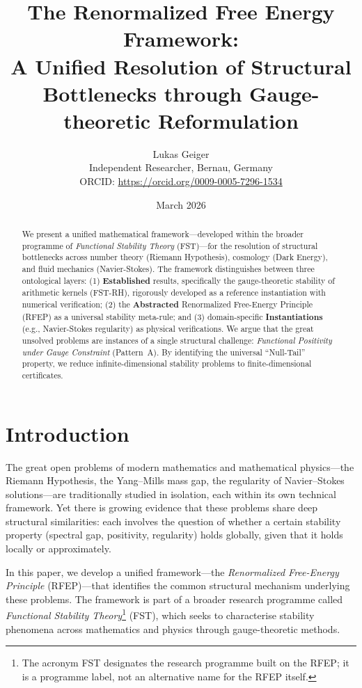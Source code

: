 \documentclass[12pt,a4paper]{article}
\title{%
  The Renormalized Free Energy Framework:\\
  A Unified Resolution of Structural Bottlenecks through Gauge-theoretic Reformulation
}
\author{%
  Lukas Geiger\\
  \small Independent Researcher, Bernau, Germany\\
  \small ORCID: \url{https://orcid.org/0009-0005-7296-1534}
}
\date{March 2026}
\theoremstyle{definition}
\theoremstyle{remark}
\begin{document}
\maketitle

\begin{abstract}
We present a unified mathematical framework---developed within the broader programme of \emph{Functional Stability Theory} (FST)---for the resolution of structural bottlenecks across number theory (Riemann Hypothesis), cosmology (Dark Energy), and fluid mechanics (Navier-Stokes). The framework distinguishes between three ontological layers: (1) \textbf{Established} results, specifically the gauge-theoretic stability of arithmetic kernels (FST-RH), rigorously developed as a reference instantiation with numerical verification; (2) the \textbf{Abstracted} Renormalized Free-Energy Principle (RFEP) as a universal stability meta-rule; and (3) domain-specific \textbf{Instantiations} (e.g., Navier-Stokes regularity) as physical verifications. We argue that the great unsolved problems are instances of a single structural challenge: \emph{Functional Positivity under Gauge Constraint} (Pattern~A). By identifying the universal ``Null-Tail'' property, we reduce infinite-dimensional stability problems to finite-dimensional certificates.
\end{abstract}

\tableofcontents

\section{Introduction}

The great open problems of modern mathematics and mathematical physics---the Riemann Hypothesis, the Yang--Mills mass gap, the regularity of Navier--Stokes solutions---are traditionally studied in isolation, each within its own technical framework. Yet there is growing evidence that these problems share deep structural similarities: each involves the question of whether a certain stability property (spectral gap, positivity, regularity) holds globally, given that it holds locally or approximately.

In this paper, we develop a unified framework---the \emph{Renormalized Free-Energy Principle} (RFEP)---that identifies the common structural mechanism underlying these problems. The framework is part of a broader research programme called \emph{Functional Stability Theory}\footnote{The acronym FST designates the research programme built on the RFEP; it is a programme label, not an alternative name for the RFEP itself.} (FST), which seeks to characterise stability phenomena across mathematics and physics through gauge-theoretic methods.
\end{document}

